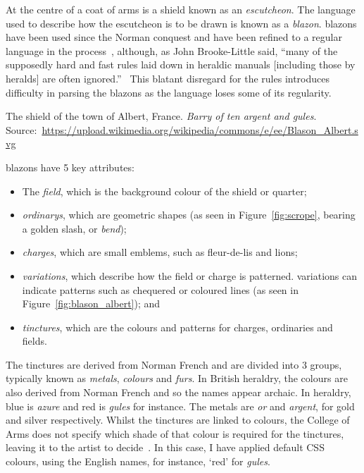 \documentclass[nobib, a4paper, twoside, justified]{tufte-book}
\makeatletter
\newcommand{\charge}{\gls{charge}\@\xspace}
\newcommand{\charges}{\glspl{charge}\@\xspace}
\newcommand{\quarter}{\gls{quarter}\@\xspace}
\newcommand{\blazon}{\gls{blazon}\@\xspace}
\newcommand{\blazons}{\glspl{blazon}\@\xspace}
\newcommand{\ublazons}{\Glspl{blazon}\@\xspace}
\makeatother
\begin{document}
At the centre of a coat of arms is a shield known as an \textit{\gls{escutcheon}}. The language
used to describe how the escutcheon is to be drawn is known as a \textit{\blazon}.
\ublazons have been used since the Norman conquest and have been refined to a regular language
in the process~\autocite{boutell_1864}, although, as John Brooke-Little said, ``many of the
supposedly hard and fast rules laid down in heraldic manuals [including those by heralds] are often
ignored.''~\autocite{brooke_little_1985} This blatant disregard for the rules introduces
difficulty in parsing the \blazons as the language loses some of its regularity.

\begin{marginfigure}
  \centering
  \def\svgwidth{0.8\linewidth}
  
  \caption{The shield of the town of Albert, France. \textit{Barry of ten argent and
  gules}. Source:~\url{https://upload.wikimedia.org/wikipedia/commons/e/ee/Blason_Albert.svg}}%
  \label{fig:blason_albert}
\end{marginfigure}

\ublazons have 5 key attributes:
\begin{itemize}
  \item The \textit{\gls{field}}, which is the background colour of the shield or
    \quarter;
  \item \textit{\Glspl{ordinary}}, which are geometric shapes (as seen in Figure~\ref{fig:scrope},
    bearing a golden slash, or \textit{bend});
  \item \textit{\Glspl{charge}}, which are small emblems, such as fleur-de-lis and lions;
  \item \textit{\Glspl{variation}}, which describe how the field or \charge is patterned.
    \Glspl{variation} can indicate patterns such as chequered or coloured lines (as seen in
    Figure~\ref{fig:blason_albert}); and
  \item \textit{\Glspl{tincture}}, which are the colours and patterns for \charges, ordinaries
    and fields.
\end{itemize}

The tinctures are derived from Norman French and are divided into 3 groups, typically known as
\textit{metals}, \textit{colours} and \textit{furs}. In British heraldry, the colours are also
derived from Norman French and so the names appear archaic. In heraldry, blue is \textit{azure} and
red is \textit{gules} for instance. The metals are \textit{or} and \textit{argent}, for gold and
silver respectively. Whilst the tinctures are linked to colours, the College of Arms does not
specify which shade of that colour is required for the tinctures, leaving it to the artist to
decide~\autocite{college_of_arms_faq}. In this case, I have applied default CSS colours, using the
English names, for instance, `red' for \textit{gules}.
\end{document}
